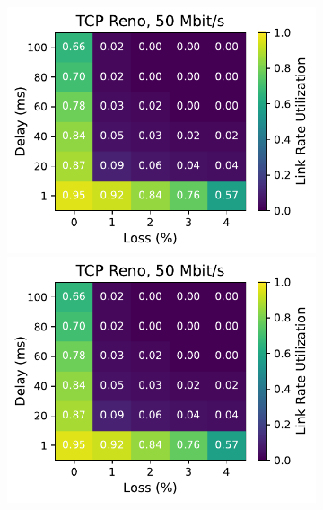 \begin{figure}[ht]
\begin{subfigure}[b]{1cm}
        \includegraphics[width=\linewidth,trim={8cm 0 0 0},clip]{figures/heatmaps/heatmap_tcp_reno_50mbps.pdf}
        \vspace*{0.22cm}
        \includegraphics[width=\linewidth,trim={8cm 0 0 0},clip]{figures/heatmaps/heatmap_tcp_reno_50mbps.pdf}
        \vspace*{0.22cm}

\end{subfigure}
\end{figure}

